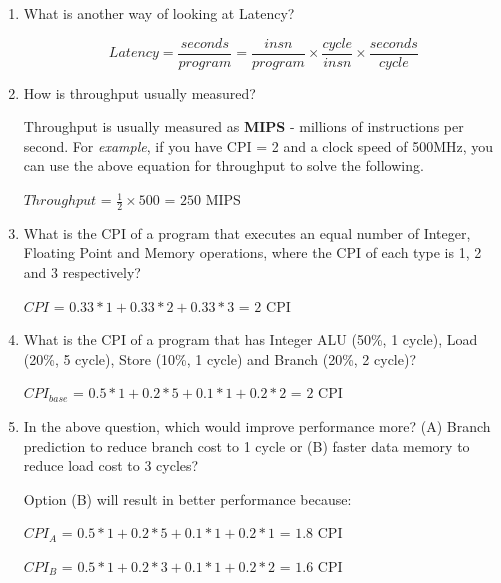 \documentclass[12pt]{article}
\newenvironment{QandA}{\begin{enumerate}[label=\bfseries\alph*.]\bfseries}
                      {\end{enumerate}}
\newenvironment{answered}{\par\quad\normalfont}{}
\begin{document}
\begin{QandA}
    \item What is another way of looking at Latency?
        \begin{answered}
        \begin{equation}
            Latency = \frac{seconds}{program} = \frac{insn}{program} \times \frac{cycle}{insn} \times \frac{seconds}{cycle}
        \end{equation}
        \end{answered}

    \item How is throughput usually measured?
        \begin{answered}
        Throughput is usually measured as \textbf{MIPS} - millions of instructions per second. For \textit{example}, if you have CPI = 2 and a clock speed of 500MHz, you can use the above equation for throughput to solve the following.
        
        $Throughput$ = $\frac{1}{2} \times 500$ = $250$ MIPS
        \end{answered}
        
    \item What is the CPI of a program that executes an equal number of Integer, Floating Point and Memory operations, where the CPI of each type is 1, 2 and 3 respectively?
        \begin{answered}
        $CPI$ = $0.33*1+0.33*2+0.33*3$ = $2$ CPI
        \end{answered}
        
    \item What is the CPI of a program that has Integer ALU (50\%, 1 cycle), Load (20\%, 5 cycle), Store (10\%, 1 cycle) and Branch (20\%, 2 cycle)?
        \begin{answered}
        $CPI_{base}$ = $0.5*1+0.2*5+0.1*1+0.2*2$ = $2$ CPI 
        \end{answered}
        
    \item In the above question, which would improve performance more? (A) Branch prediction to reduce branch cost to 1 cycle or (B) faster data memory to reduce load cost to 3 cycles?
        \begin{answered}
        Option (B) will result in better performance because:
        
        $CPI_{A}$ = $0.5*1+0.2*5+0.1*1+0.2*1$ = $1.8$ CPI
        
        $CPI_{B}$ = $0.5*1+0.2*3+0.1*1+0.2*2$ = $1.6$ CPI
        \end{answered}
        

\end{QandA}
\end{document}
